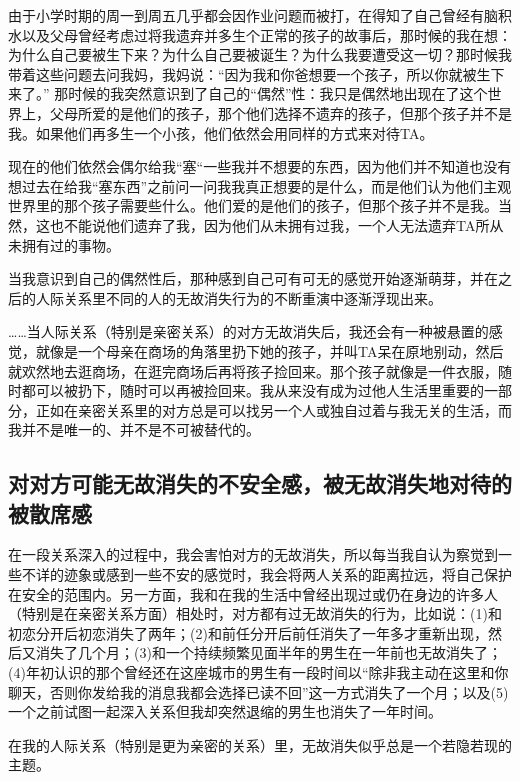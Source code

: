 由于小学时期的周一到周五几乎都会因作业问题而被打，在得知了自己曾经有脑积水以及父母曾经考虑过将我遗弃并多生个正常的孩子的故事后，那时候的我在想：为什么自己要被生下来？为什么自己要被诞生？为什么我要遭受这一切？那时候我带着这些问题去问我妈，我妈说：“因为我和你爸想要一个孩子，所以你就被生下来了。”   那时候的我突然意识到了自己的“偶然”性：我只是偶然地出现在了这个世界上，父母所爱的是他们的孩子，那个他们选择不遗弃的孩子，但那个孩子并不是我。如果他们再多生一个小孩，他们依然会用同样的方式来对待TA。

现在的他们依然会偶尔给我“塞“一些我并不想要的东西，因为他们并不知道也没有想过去在给我“塞东西”之前问一问我我真正想要的是什么，而是他们认为他们主观世界里的那个孩子需要些什么。他们爱的是他们的孩子，但那个孩子并不是我。当然，这也不能说他们遗弃了我，因为他们从未拥有过我，一个人无法遗弃TA所从未拥有过的事物。

当我意识到自己的偶然性后，那种感到自己可有可无的感觉开始逐渐萌芽，并在之后的人际关系里不同的人的无故消失行为的不断重演中逐渐浮现出来。

……当人际关系（特别是亲密关系）的对方无故消失后，我还会有一种被悬置的感觉，就像是一个母亲在商场的角落里扔下她的孩子，并叫TA呆在原地别动，然后就欢然地去逛商场，在逛完商场后再将孩子捡回来。那个孩子就像是一件衣服，随时都可以被扔下，随时可以再被捡回来。我从来没有成为过他人生活里重要的一部分，正如在亲密关系里的对方总是可以找另一个人或独自过着与我无关的生活，而我并不是唯一的、并不是不可被替代的。




\subsection*{对对方可能无故消失的不安全感，被无故消失地对待的被散席感}

在一段关系深入的过程中，我会害怕对方的无故消失，所以每当我自认为察觉到一些不详的迹象或感到一些不安的感觉时，我会将两人关系的距离拉远，将自己保护在安全的范围内。另一方面，我和在我的生活中曾经出现过或仍在身边的许多人（特别是在亲密关系方面）相处时，对方都有过无故消失的行为，比如说：(1)和初恋分开后初恋消失了两年；(2)和前任分开后前任消失了一年多才重新出现，然后又消失了几个月；(3)和一个持续频繁见面半年的男生在一年前也无故消失了；(4)年初认识的那个曾经还在这座城市的男生有一段时间以“除非我主动在这里和你聊天，否则你发给我的消息我都会选择已读不回”这一方式消失了一个月；以及(5)一个之前试图一起深入关系但我却突然退缩的男生也消失了一年时间。

在我的人际关系（特别是更为亲密的关系）里，无故消失似乎总是一个若隐若现的主题。

